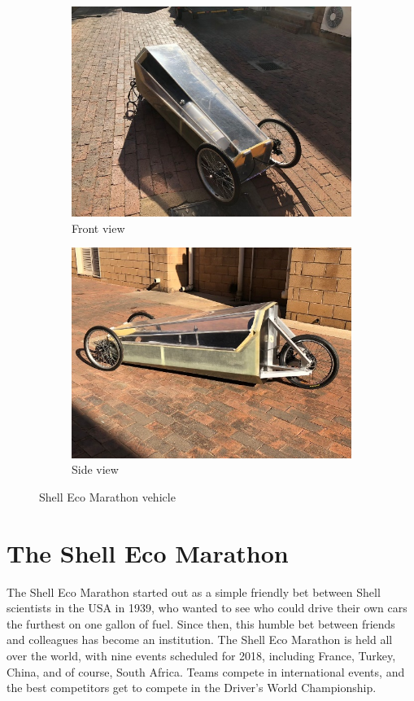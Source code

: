 \documentclass[a4paper, 12pt]{article}
\begin{document}
		\begin{figure}[H]
			\begin{subfigure}{0.5\textwidth}
				\includegraphics{img/front_view.jpg}
				\caption{Front view}
			\end{subfigure}
			\begin{subfigure}{0.5\textwidth}
				\includegraphics{img/side_view.jpg}
				\caption{Side view}
			\end{subfigure}
			\caption{Shell Eco Marathon vehicle}
		\end{figure}
	\newpage
	\section{The Shell Eco Marathon} %
	\label{sec:the_shell_eco_marathon}
		The Shell Eco Marathon started out as a simple friendly bet between Shell scientists in the USA in 1939, who wanted to see who could drive their own cars the furthest on one gallon of fuel. Since then, this humble bet between friends and colleagues has become an institution. The Shell Eco Marathon is held all over the world, with nine events scheduled for 2018, including France, Turkey, China, and of course, South Africa. Teams compete in international events, and the best competitors get to compete in the Driver's World Championship.
\end{document}
